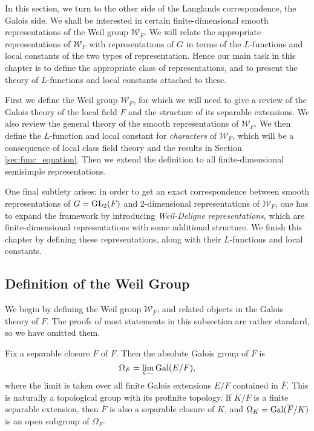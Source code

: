 In this section, we turn to the other side of the Langlands correspondence, the Galois side. We shall be interested in certain finite-dimensional smooth representations of the Weil group $\mathcal{W}_F$. We will relate the appropriate representations of $\mathcal{W}_F$ with representations of $G$ in terms of the $L$-functions and local constants of the two types of representation. Hence our main task in this chapter is to define the appropriate class of representations, and to present the theory of $L$-functions and local constants attached to these.

First we define the Weil group $\mathcal{W}_F$, for which we will need to give a review of the Galois theory of the local field $F$ and the structure of its separable extensions. We also review the general theory of the smooth representations of $\mathcal{W}_F$. We then define the $L$-function and local constant for \emph{characters} of $\mathcal{W}_F$, which will be a consequence of local class field theory and the results in Section \ref{sec:func_equation}. Then we extend the definition to all finite-dimensional semisimple representations.

One final subtlety arises: in order to get an exact correspondence between smooth representations of $G = \mathrm{GL}_2(F)$ and 2-dimensional representations of $\mathcal{W}_F$, one has to expand the framework by introducing \emph{Weil-Deligne representations}, which are finite-dimensional representations with some additional structure. We finish this chapter by defining these representations, along with their $L$-functions and local constants.

\subsection{Definition of the Weil Group}
We begin by defining the Weil group $\mathcal{W}_F$, and related objects in the Galois theory of $F$. The proofs of most statements in this subsection are rather standard, so we have omitted them.

Fix a separable closure $\overline{F}$ of $F$. Then the absolute Galois group of $F$ is
\[\Omega_F = \varprojlim\mathrm{Gal}(E/F),\]
where the limit is taken over all finite Galois extensions $E/F$ contained in $\overline{F}$. This is naturally a topological group with its profinite topology. If $K/F$ is a finite separable extension, then $\overline{F}$ is also a separable closure of $K$, and $\Omega_K = \mathrm{Gal}(\overline{F}/K)$ is an open subgroup of $\Omega_F$.

